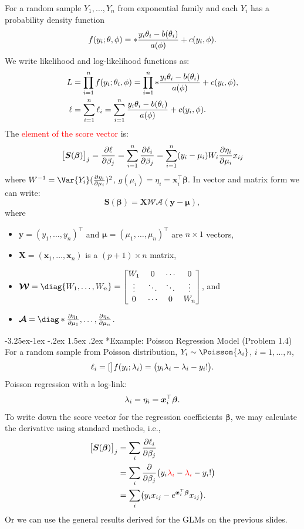 \documentclass[final]{article}\usepackage[]{graphicx}\usepackage[svgnames]{xcolor}
\makeatletter
\renewcommand\subsection{\@startsection{subsection}{2}{\z@}%
                                     {-3.25ex\@plus -1ex \@minus -.2ex}%
                                     {1.5ex \@plus .2ex}%
                                     {\normalfont\large\bfseries\scshape\color{Blue}}}
\let\exp\relax%
\let\log\relax%
\providecommand{\Vector}[1]{\bm{#1}}%
\providecommand{\Matrix}[1]{\bm{#1}}
\providecommand{\MatrixCal}[1]{\bm{\mathcal{#1}}}
\makeatother
\begin{document}
For a random sample $ Y_1,\ldots,Y_n $ from exponential family and each $ Y_i $ has a probability density function
\[ f(y_i;\theta,\phi)=\exp*{\frac{y_i\theta_i-b(\theta_i)}{a(\phi)}+c(y_i,\phi)}. \]
We write likelihood and log-likelihood functions as:
\begin{align*}
    L    & =\prod_{i=1}^n f(y_i;\theta_i,\phi)=\prod_{i=1}^n\exp*{\frac{y_i\theta_i-b(\theta_i)}{a(\phi)}+c(y_i,\phi)}, \\
    \ell & =\sum_{i=1}^{n} \ell_i=\sum_{i=1}^{n}\frac{y_i\theta_i-b(\theta_i)}{a(\phi)}+c(y_i,\phi).
\end{align*}
The \textcolor{Red}{element of the score vector} is:
\[ \bigl[\Vector{S}(\Vector{\beta})\bigr]_j=\pdv{\ell}{\beta_j}=\sum_{i=1}^{n} \pdv{\ell_i}{\beta_j}=\sum_{i=1}^{n} (y_i-\mu_i)W_i\pdv{\eta_i}{\mu_i}x_{ij} \]
where $  W^{-1}=\Var{Y_i}(\pdv{\eta_i}{\mu_i})^2 $, $ g(\mu_i)=\eta_i=\Vector{x}_i^\top \Vector{\beta} $. In vector and matrix form we can write:
\[ \Vector{S}(\Vector{\beta})=\Matrix{X}\MatrixCal{W}\MatrixCal{A}(\Vector{y}-\Vector{\mu}), \]
where
\begin{itemize}
    \item $ \Vector{y}=(y_1,\ldots,y_n)^\top $ and $ \Vector{\mu}=(\mu_1,\ldots,\mu_n)^\top $ are $ n\times 1 $ vectors,
    \item $ \Matrix{X}=(\Vector{x}_1,\ldots,\Vector{x}_n) $ is a $ (p+1)\times n $ matrix,
    \item $ \MatrixCal{W}=\diag{W_1,\ldots,W_n}=\begin{bmatrix}
                  W_1    & 0      & \cdots & 0      \\
                  \vdots & \ddots & \ddots & \vdots \\
                  0      & \cdots & 0      & W_n
              \end{bmatrix} $, and
    \item $ \MatrixCal{A}=\diag*{\pdv{\eta_1}{\mu_1},\ldots,\pdv{\eta_n}{\mu_n}} $.
\end{itemize}
\subsection*{Example: Poisson Regression Model (Problem 1.4)}
For a random sample from Poisson distribution, $ Y_i \sim \Poisson{\lambda_i} $, $ i=1,\ldots,n $,
\[ \ell_i=\log[\big]{f(y_i;\lambda_i)}=\bigl(y_i\log{\lambda_i}-\lambda_i-\log{y_i!}\bigr). \]
Poisson regression with a log-link:
\[ \log{\lambda_i}=\eta_i=\Vector{x}_i^\top \Vector{\beta}. \]
To write down the score vector for the regression coefficients $ \Vector{\beta} $, we may
calculate the derivative using standard methods, i.e.,
\begin{align*}
    \bigl[\Vector{S}(\Vector{\beta})\bigr]_j
     & =\sum_i \pdv{\ell_i}{\beta_j}                                                                                  \\
     & =\sum_i \pdv*{\bigl(y_i \textcolor{Red}{\log{\lambda_i}}-\textcolor{Red}{\lambda_i}-\log{y_i!}\bigr)}{\beta_j} \\
     & =\sum_i\bigl(y_i x_{ij}-e^{\Vector{x}_i^\top \Vector{\beta}}x_{ij}\bigr).
\end{align*}
Or we can use the general results derived for the GLMs on the previous slides.
\end{document}
